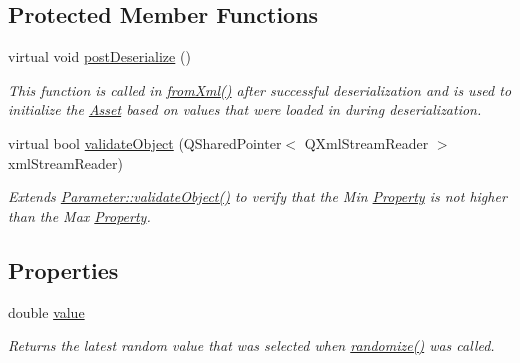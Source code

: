 \subsection*{Protected Member Functions}
\begin{DoxyCompactItemize}
\item 
virtual void \hyperlink{class_picto_1_1_random_double_parameter_a829224c9299a0f14b32915cf99d38086}{post\-Deserialize} ()
\begin{DoxyCompactList}\small\item\em This function is called in \hyperlink{class_picto_1_1_asset_a8bed4da09ecb1c07ce0dab313a9aba67}{from\-Xml()} after successful deserialization and is used to initialize the \hyperlink{class_picto_1_1_asset}{Asset} based on values that were loaded in during deserialization. \end{DoxyCompactList}\item 
\hypertarget{class_picto_1_1_random_double_parameter_a02544c24f46db51ec92e76e5f99969ab}{virtual bool \hyperlink{class_picto_1_1_random_double_parameter_a02544c24f46db51ec92e76e5f99969ab}{validate\-Object} (Q\-Shared\-Pointer$<$ Q\-Xml\-Stream\-Reader $>$ xml\-Stream\-Reader)}\label{class_picto_1_1_random_double_parameter_a02544c24f46db51ec92e76e5f99969ab}

\begin{DoxyCompactList}\small\item\em Extends \hyperlink{class_picto_1_1_parameter_a94c0e4191ffcc0bd642b647d24557082}{Parameter\-::validate\-Object()} to verify that the Min \hyperlink{class_picto_1_1_property}{Property} is not higher than the Max \hyperlink{class_picto_1_1_property}{Property}. \end{DoxyCompactList}\end{DoxyCompactItemize}
\subsection*{Properties}
\begin{DoxyCompactItemize}
\item 
double \hyperlink{class_picto_1_1_random_double_parameter_a56665a410b8ac41b4b6a983b9f39ef65}{value}
\begin{DoxyCompactList}\small\item\em Returns the latest random value that was selected when \hyperlink{class_picto_1_1_random_double_parameter_a8de295a1b08b19b4c413419df42fe7e9}{randomize()} was called. \end{DoxyCompactList}\end{DoxyCompactItemize}
